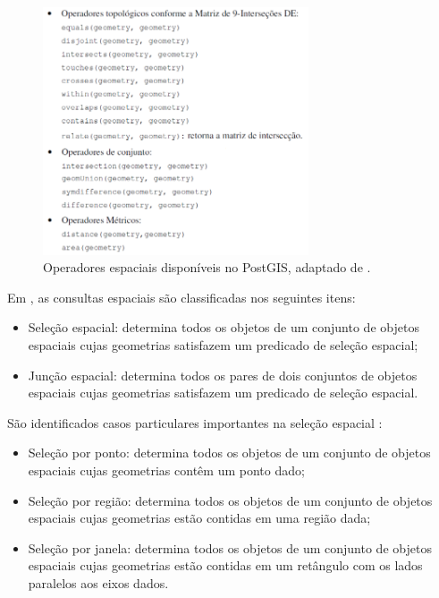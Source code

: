 \begin{figure}[h]
\centering
\includegraphics[width=0.70\textwidth]{./img/cap_II/16-OperadoresPostGIS}
\caption{Operadores espaciais disponíveis no PostGIS, adaptado de \cite{queirozferreira}.}
\label{fig:OperadoresPostGIS}
\end{figure}

\newpage

Em , as consultas espaciais são classificadas nos seguintes itens:

\begin{itemize}
\item Seleção espacial: determina todos os objetos de um conjunto de objetos espaciais cujas geometrias satisfazem um predicado de seleção espacial;
\item Junção espacial: determina todos os pares de dois conjuntos de objetos espaciais cujas geometrias satisfazem um predicado de seleção espacial.
\end{itemize}

São identificados casos particulares importantes na seleção espacial \cite{spatialjoins}:

\begin{itemize}
\item Seleção por ponto: determina todos os objetos de um conjunto de objetos espaciais cujas geometrias contêm um ponto dado;
\item Seleção por região: determina todos os objetos de um conjunto de objetos espaciais cujas geometrias estão contidas em uma região dada;
\item Seleção por janela: determina todos os objetos de um conjunto de objetos espaciais cujas geometrias estão contidas em um retângulo com os lados paralelos aos eixos dados.
\end{itemize}

